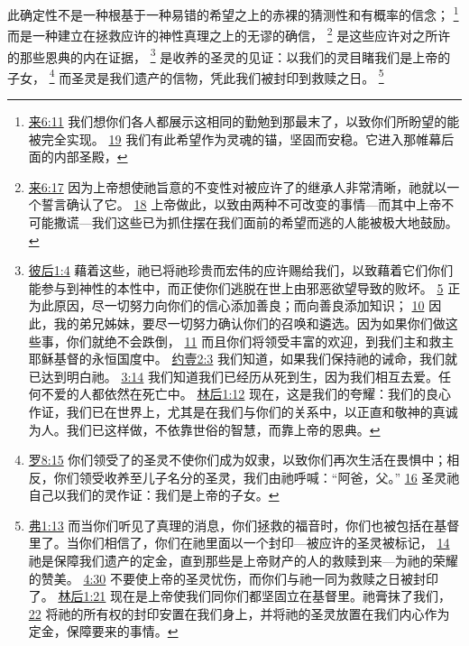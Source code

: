 \documentclass[12pt, a4paper, oneside]{ctexart}
\newcounter{parnum}[section]
\newcommand{\N}{%
   \noindent\refstepcounter{parnum}%
    \makebox[\parindent][l]{\textbf{\arabic{parnum}.}}}
\begin{document}
\N 此确定性不是一种根基于一种易错的希望之上的赤裸的猜测性和有概率的信念；
	\footnote {
		\href{https://biblehub.com/hebrews/6-11.htm}{来6:11} 我们想你们各人都展示这相同的勤勉到那最末了，以致你们所盼望的能被完全实现。
		\href{https://biblehub.com/hebrews/6-19.htm}{19} 我们有此希望作为灵魂的锚，坚固而安稳。它进入那帷幕后面的内部圣殿，
	}
	而是一种建立在拯救应许的神性真理之上的无谬的确信，
	\footnote {
		\href{https://biblehub.com/hebrews/6-17.htm}{来6:17} 因为上帝想使祂旨意的不变性对被应许了的继承人非常清晰，祂就以一个誓言确认了它。
		\href{https://biblehub.com/hebrews/6-18.htm}{18} 上帝做此，以致由两种不可改变的事情---而其中上帝不可能撒谎---我们这些已为抓住摆在我们面前的希望而逃的人能被极大地鼓励。
	}
	是这些应许对之所许的那些恩典的内在证据，
	\footnote {
		\href{https://biblehub.com/2_peter/1-4.htm}{彼后1:4} 藉着这些，祂已将祂珍贵而宏伟的应许赐给我们，以致藉着它们你们能参与到神性的本性中，而正使你们逃脱在世上由邪恶欲望导致的败坏。
		\href{https://biblehub.com/2_peter/1-5.htm}{5} 正为此原因，尽一切努力向你们的信心添加善良；而向善良添加知识；
		\href{https://biblehub.com/2_peter/1-10.htm}{10} 因此，我的弟兄姊妹，要尽一切努力确认你们的召唤和遴选。因为如果你们做这些事，你们就绝不会跌倒，
		\href{https://biblehub.com/2_peter/1-11.htm}{11} 而且你们将领受丰富的欢迎，到我们主和救主耶稣基督的永恒国度中。
		\href{https://biblehub.com/1_john/2-3.htm}{约壹2:3} 我们知道，如果我们保持祂的诫命，我们就已达到明白祂。
		\href{https://biblehub.com/1_john/3-14.htm}{3:14} 我们知道我们已经历从死到生，因为我们相互去爱。任何不爱的人都依然在死亡中。
		\href{https://biblehub.com/2_corinthians/1-12.htm}{林后1:12} 现在，这是我们的夸耀：我们的良心作证，我们已在世界上，尤其是在我们与你们的关系中，以正直和敬神的真诚为人。我们已这样做，不依靠世俗的智慧，而靠上帝的恩典。
	}
	是收养的圣灵的见证：以我们的灵目睹我们是上帝的子女，
	\footnote {
		\href{https://biblehub.com/romans/8-15.htm}{罗8:15} 你们领受了的圣灵不使你们成为奴隶，以致你们再次生活在畏惧中；相反，你们领受收养至儿子名分的圣灵，我们由祂呼喊：“阿爸，父。”
		\href{https://biblehub.com/romans/8-16.htm}{16} 圣灵祂自己以我们的灵作证：我们是上帝的子女。
	}
	而圣灵是我们遗产的信物，凭此我们被封印到救赎之日。
	\footnote {
		\href{https://biblehub.com/ephesians/1-13.htm}{弗1:13} 而当你们听见了真理的消息，你们拯救的福音时，你们也被包括在基督里了。当你们相信了，你们在祂里面以一个封印---被应许的圣灵被标记，
		\href{https://biblehub.com/ephesians/1-14.htm}{14} 祂是保障我们遗产的定金，直到那些是上帝财产的人的救赎到来---为祂的荣耀的赞美。
		\href{https://biblehub.com/ephesians/4-30.htm}{4:30} 不要使上帝的圣灵忧伤，而你们与祂一同为救赎之日被封印了。
		\href{https://biblehub.com/2_corinthians/1-21.htm}{林后1:21} 现在是上帝使我们同你们都坚固立在基督里。祂膏抹了我们，
		\href{https://biblehub.com/2_corinthians/1-22.htm}{22} 将祂的所有权的封印安置在我们身上，并将祂的圣灵放置在我们内心作为定金，保障要来的事情。
	}
\end{document}
